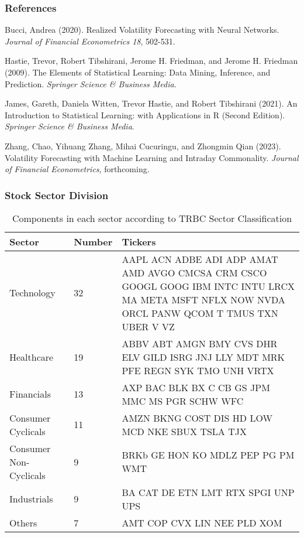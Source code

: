 \documentclass[handout]{beamer}
\begin{document}
\begin{frame}[allowframebreaks]
\frametitle{References}
\footnotesize{
\begin{thebibliography}{99} %


 Bucci, Andrea (2020).
\newblock Realized Volatility Forecasting with Neural Networks.
\newblock \emph{Journal of Financial Econometrics 18}, 502-531.


 Hastie, Trevor, Robert Tibshirani, Jerome H. Friedman, and Jerome H. Friedman (2009).
\newblock  The Elements of Statistical Learning: Data Mining, Inference, and Prediction.
\newblock \emph{Springer Science \& Business Media}.


 James, Gareth, Daniela Witten, Trevor  Hastie, and Robert Tibshirani (2021).
\newblock  An Introduction to Statistical Learning: with Applications in R (Second Edition).
\newblock \emph{Springer Science \& Business Media}.

 Zhang,  Chao, Yihuang Zhang, Mihai Cucuringu, and Zhongmin Qian (2023).
\newblock Volatility Forecasting with Machine Learning and Intraday Commonality.
\newblock \emph{Journal of Financial Econometrics}, forthcoming.

\end{thebibliography}
}
\end{frame}

\appendix
\begin{frame}
\label{sector}
\frametitle{Stock Sector Division}

\begin{table}
\caption{\label{table01}Components in each sector according to TRBC Sector Classification}
\scriptsize	
\begin{tabularx}{\textwidth}{llX}
\hline
 Sector & Number & Tickers  \\ [0.5ex] 
 \hline
 Technology & 32 & AAPL ACN ADBE  ADI ADP AMAT AMD AVGO \mbox{CMCSA} CRM CSCO GOOGL GOOG IBM INTC INTU LRCX MA META MSFT NFLX NOW NVDA ORCL PANW QCOM T TMUS TXN UBER V VZ  \\ 
 Healthcare & 19 & ABBV ABT AMGN BMY CVS DHR ELV GILD ISRG JNJ LLY MDT MRK PFE REGN SYK TMO UNH VRTX  \\
 Financials & 13 & AXP BAC BLK BX C CB GS JPM MMC MS PGR SCHW WFC \\
 Consumer Cyclicals & 11 & AMZN BKNG COST DIS HD LOW MCD NKE SBUX TSLA TJX  \\
Consumer Non-Cyclicals & 9 & BRKb GE HON KO MDLZ PEP PG PM WMT  \\ 
 Industrials & 9 & BA CAT DE ETN LMT RTX SPGI UNP UPS  \\ 
 Others & 7 & AMT COP CVX LIN NEE PLD XOM  \\[1ex] 
 \hline
\end{tabularx}%
\end{table}
\hyperlink{data}{}
\end{frame}




\end{document}

